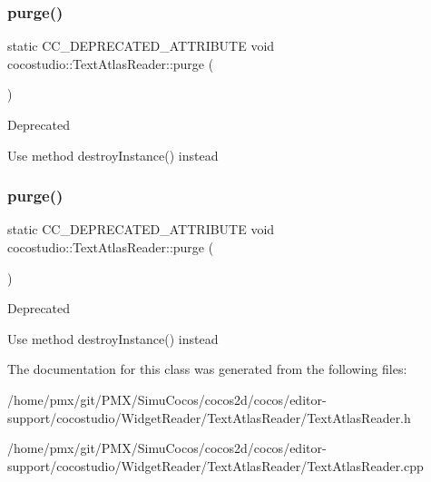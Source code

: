 \subsubsection{\texorpdfstring{purge()}{purge()}\hspace{0.1cm}{\footnotesize\ttfamily [1/2]}}
{\footnotesize\ttfamily static C\+C\+\_\+\+D\+E\+P\+R\+E\+C\+A\+T\+E\+D\+\_\+\+A\+T\+T\+R\+I\+B\+U\+TE void cocostudio\+::\+Text\+Atlas\+Reader\+::purge (\begin{DoxyParamCaption}{ }\end{DoxyParamCaption})\hspace{0.3cm}{\ttfamily [static]}}

\begin{DoxyRefDesc}{Deprecated}
\item[\hyperlink{deprecated__deprecated000107}{Deprecated}]Use method destroy\+Instance() instead \end{DoxyRefDesc}
\mbox{\label{classcocostudio_1_1TextAtlasReader_a078bc1f569673be32e7c8debaf758c77}} 
\subsubsection{\texorpdfstring{purge()}{purge()}\hspace{0.1cm}{\footnotesize\ttfamily [2/2]}}
{\footnotesize\ttfamily static C\+C\+\_\+\+D\+E\+P\+R\+E\+C\+A\+T\+E\+D\+\_\+\+A\+T\+T\+R\+I\+B\+U\+TE void cocostudio\+::\+Text\+Atlas\+Reader\+::purge (\begin{DoxyParamCaption}{ }\end{DoxyParamCaption})\hspace{0.3cm}{\ttfamily [static]}}

\begin{DoxyRefDesc}{Deprecated}
\item[\hyperlink{deprecated__deprecated000342}{Deprecated}]Use method destroy\+Instance() instead \end{DoxyRefDesc}


The documentation for this class was generated from the following files\+:\begin{DoxyCompactItemize}
\item 
/home/pmx/git/\+P\+M\+X/\+Simu\+Cocos/cocos2d/cocos/editor-\/support/cocostudio/\+Widget\+Reader/\+Text\+Atlas\+Reader/Text\+Atlas\+Reader.\+h\item 
/home/pmx/git/\+P\+M\+X/\+Simu\+Cocos/cocos2d/cocos/editor-\/support/cocostudio/\+Widget\+Reader/\+Text\+Atlas\+Reader/Text\+Atlas\+Reader.\+cpp\end{DoxyCompactItemize}
